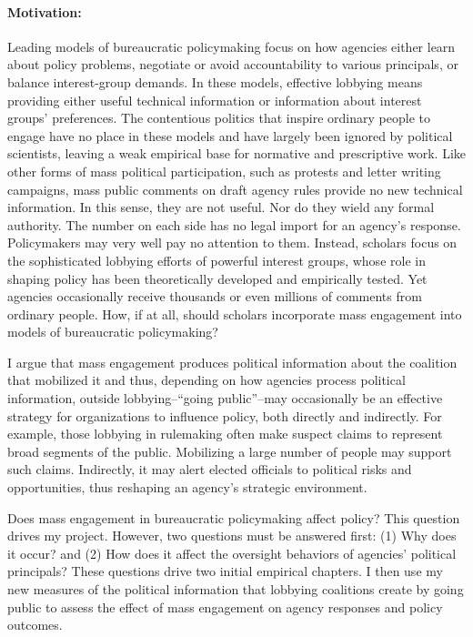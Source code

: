 \paragraph{Motivation:} Leading models of bureaucratic policymaking focus on how agencies either learn about policy problems, negotiate or avoid accountability to various principals, or balance interest-group demands. In these models, effective lobbying means providing either useful technical information or information about interest groups' preferences. 
The contentious politics that inspire ordinary people to engage have no place in these models and have largely been ignored by political scientists, leaving a weak empirical base for normative and prescriptive work. 
Like other forms of mass political participation, such as protests and letter writing campaigns, 
mass public comments on draft agency rules provide no new technical information. In this sense, they are not useful. Nor do they wield any formal authority. 
The number on each side has no legal import for an agency's response.
Policymakers may very well pay no attention to them. 
Instead, scholars focus on the sophisticated lobbying efforts of powerful interest groups, whose role in shaping policy has been theoretically developed and empirically tested.
Yet agencies occasionally receive thousands or even millions of comments from ordinary people. %
How, if at all, should scholars incorporate mass engagement into models of bureaucratic policymaking? 

I argue that mass engagement produces political information about the coalition that mobilized it and thus, depending on how agencies process political information, outside lobbying--``going public''--may occasionally be an effective strategy for organizations to influence policy, both directly and indirectly.
For example, those lobbying in rulemaking often make suspect claims to represent broad segments of the public. Mobilizing a large number of people may support such claims.
Indirectly, it may alert elected officials to political risks and opportunities, thus reshaping an agency's strategic environment.

Does mass engagement in bureaucratic policymaking affect policy? This question drives my project. However, two questions must be answered first: (1) Why does it occur? and (2) How does it affect the oversight behaviors of agencies' political principals? These questions drive two initial empirical chapters.
I then use my new measures of the political information that lobbying coalitions create by going public to assess the effect of mass engagement on agency responses and policy outcomes.%

